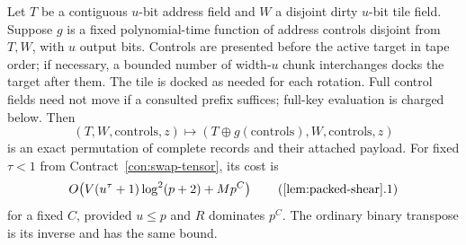 \begin{lemma}\label{lem:packed-shear}
Let $T$ be a contiguous $u$-bit address field and $W$ a disjoint dirty $u$-bit tile field. Suppose $g$ is a fixed polynomial-time function of address controls disjoint from $T,W$, with $u$ output bits. Controls are presented before the active target in tape order; if necessary, a bounded number of width-$u$ chunk interchanges docks the target after them. The tile is docked as needed for each rotation. Full control fields need not move if a consulted prefix suffices; full-key evaluation is charged below. Then
\[
 (T,W,\mathrm{controls},z)\longmapsto
 (T\mathbin\oplus g(\mathrm{controls}),W,\mathrm{controls},z)
\]
is an exact permutation of complete records and their attached payload. For fixed $\tau<1$ from Contract~\ref{con:swap-tensor}, its cost is
\[
 O\!\left(V(u^\tau+1)\log^2(p+2)+Mp^C\right)
 \tag{\ref{lem:packed-shear}.1}
\]
for a fixed $C$, provided $u\le p$ and $R$ dominates $p^C$. The ordinary binary transpose is its inverse and has the same bound.
\end{lemma}

